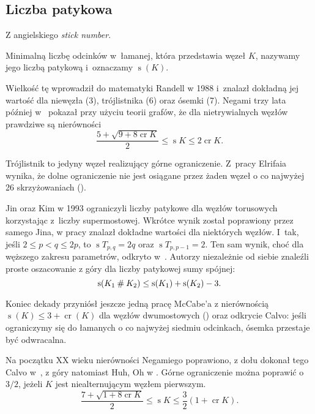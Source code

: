 
\subsection{Liczba patykowa} %
\label{sub:stick_index}
Z angielskiego \emph{stick number}.

\begin{definition}
	Minimalną liczbę odcinków w~łamanej, która przedstawia węzeł $K$, nazywamy jego liczbą patykową i~oznaczamy $\operatorname{s}(K)$.
\end{definition}

Wielkość tę wprowadził do matematyki Randell w 1988 i~znalazł dokładną jej wartość dla niewęzła (3), trójlistnika (6) oraz ósemki (7).
Negami trzy lata później w~\cite{negami91} pokazał przy użyciu teorii grafów, że dla nietrywialnych węzłów prawdziwe są nierówności
\begin{equation}
    \frac{5+\sqrt{9 + 8 \operatorname{cr} K}}{2} \le \operatorname{s} K \le 2 \operatorname{cr} K.
\end{equation}

Trójlistnik to jedyny węzeł realizujący górne ograniczenie.
Z~pracy Elrifaia wynika, że dolne ograniczenie nie jest osiągane przez żaden węzeł o co najwyżej 26 skrzyżowaniach (\cite{elrifai06}).

Jin oraz Kim w 1993 ograniczyli liczby patykowe dla węzłów torusowych korzystając z~liczby supermostowej.
Wkrótce wynik został poprawiony przez samego Jina, w pracy \cite{jin97} znalazł dokładne wartości dla niektórych węzłów.
I~tak, jeśli $2 \le p < q \le 2p$, to $\operatorname{s} T_{p,q} = 2q$ oraz $\operatorname{s} T_{p, p-1} = 2$.
Ten sam wynik, choć dla węższego zakresu parametrów, odkryto w~\cite{greilsheimer97}.
Autorzy niezależnie od siebie znaleźli proste oszacowanie z góry dla liczby patykowej sumy spójnej:
\begin{equation}
	\operatorname{s}(K_1 \mathbin{\#} K_2) \le \operatorname{s}(K_1) + \operatorname{s}(K_2) - 3.
\end{equation}

Koniec dekady przyniósł jeszcze jedną pracę McCabe'a z nierównością $\operatorname{s}(K) \le 3 + \operatorname{cr} (K)$ dla węzłów dwumostowych (\cite{mccabe98}) oraz odkrycie Calvo: jeśli ograniczymy się do łamanych o co najwyżej siedmiu odcinkach, ósemka przestaje być odwracalna.

Na początku XX wieku nierówności Negamiego poprawiono, z dołu dokonał tego Calvo w~\cite{calvo01}, z góry natomiast Huh, Oh w \cite{huh11}.
Górne ograniczenie można poprawić o $3/2$, jeżeli $K$ jest niealternującym węzłem pierwszym.
\begin{equation}
    \frac{7+\sqrt{1 + 8 \operatorname{cr} K}}{2} \le \operatorname{s} K \le \frac{3}{2} (1 + \operatorname{cr} K).
\end{equation}

